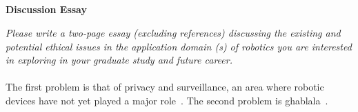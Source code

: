 \documentclass[12pt]{article}
\title{
    \vspace{2in}
    \textmd{\textbf{\hmwkClass\ \hmwkTitle}}\\
    \vspace{3in}
}
\author{\hmwkAuthorName}
\date{}
\begin{document}
\maketitle

\pagebreak

\begin{center}
    \large\textbf{Discussion Essay}
\end{center}

\textit{Please write a two-page essay (excluding references) discussing the existing and potential 
ethical issues in the application domain (s) of robotics you are interested in exploring in your 
graduate study and future career.}\\
\vspace{0in}\\
The first problem is that of privacy and surveillance, an area where robotic devices have not yet played a major role~\cite{sep-ethics-ai}.
The second problem is ghablala~\cite{Nobody06}.
\lipsum[1]\\
\vspace{0in}\\
\lipsum[2]\\
\vspace{0in}\\
\lipsum[3]\\
\vspace{0in}\\
\lipsum[4]\\
\vspace{0in}\\
\lipsum[5]\\
\vspace{0in}\\
\lipsum[6]\\
\vspace{0in}\\
\lipsum[7]\\
\vspace{0in}\\
\lipsum[8]\\
\vspace{0in}\\
\lipsum[9]\\
\vspace{0in}\\
\lipsum[10]



\end{document}
